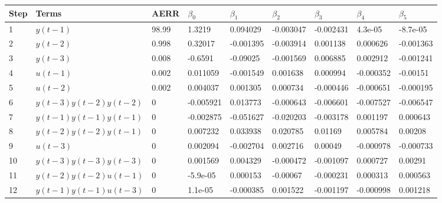\begin{tabular}{lllllllll}
Step & Terms & AERR & $\beta_{0}$ & $\beta_{1}$ & $\beta_{2}$ & $\beta_{3}$ & $\beta_{4}$ & $\beta_{5}$ \\ 
\hline 
1 & $y(t-1)$ & 98.99 & 1.3219 & 0.094029 & -0.003047 & -0.002431 & 4.3e-05 & -8.7e-05 \\ 
2 & $y(t-2)$ & 0.998 & 0.32017 & -0.001395 & -0.003914 & 0.001138 & 0.000626 & -0.001363 \\ 
3 & $y(t-3)$ & 0.008 & -0.6591 & -0.09025 & -0.001569 & 0.006885 & 0.002912 & -0.001241 \\ 
4 & $u(t-1)$ & 0.002 & 0.011059 & -0.001549 & 0.001638 & 0.000994 & -0.000352 & -0.00151 \\ 
5 & $u(t-2)$ & 0.002 & 0.004037 & 0.001305 & 0.000734 & -0.000446 & -0.000651 & -0.000195 \\ 
6 & $y(t-3)y(t-2)y(t-2)$ & 0 & -0.005921 & 0.013773 & -0.000643 & -0.006601 & -0.007527 & -0.006547 \\ 
7 & $y(t-1)y(t-1)y(t-1)$ & 0 & -0.002875 & -0.051627 & -0.020203 & -0.003178 & 0.001197 & 0.000643 \\ 
8 & $y(t-2)y(t-2)y(t-1)$ & 0 & 0.007232 & 0.033938 & 0.020785 & 0.01169 & 0.005784 & 0.00208 \\ 
9 & $u(t-3)$ & 0 & 0.002094 & -0.002704 & 0.002716 & 0.00049 & -0.000978 & -0.000733 \\ 
10 & $y(t-3)y(t-3)y(t-3)$ & 0 & 0.001569 & 0.004329 & -0.000472 & -0.001097 & 0.000727 & 0.00291 \\ 
11 & $y(t-2)y(t-2)u(t-1)$ & 0 & -5.9e-05 & 0.000153 & -0.00067 & -0.000231 & 0.000313 & 0.000563 \\ 
12 & $y(t-1)y(t-1)u(t-3)$ & 0 & 1.1e-05 & -0.000385 & 0.001522 & -0.001197 & -0.000998 & 0.001218 \\ 
\hline 
\end{tabular}